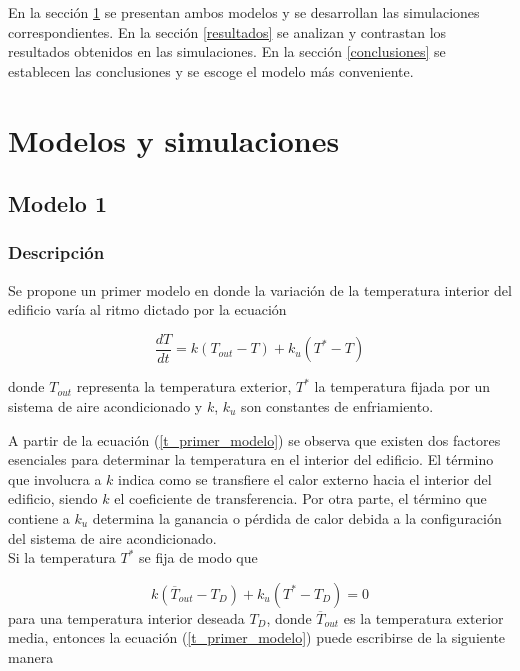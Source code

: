 \documentclass{sig-alternate}
\begin{document}
En la secci\'{o}n \ref{modelosysimulaciones} se presentan ambos modelos y
se de\-sa\-rro\-llan las simulaciones correspondientes.
En la secci\'{o}n \ref{resultados} se analizan y contrastan los resultados
obtenidos en las simulaciones.
En la secci\'{o}n \ref{conclusiones} se establecen las conclusiones y se
escoge el modelo m\'{a}s conveniente.

\section{Modelos y simulaciones}\label{modelosysimulaciones}

\subsection{Modelo 1}

\subsubsection{Descripci\'{o}n}

Se propone un primer modelo en donde la variaci\'{o}n de la temperatura interior
del edificio var\'{i}a al ritmo dictado por la ecuaci\'{o}n

\begin{equation}
\label{t_primer_modelo}
\frac{dT}{dt} = k ( T_{out} - T ) + k_{u} ( T^{*} - T )
\end{equation}

donde $T_{out}$ representa la temperatura exterior, $T^{*}$ la temperatura
fijada por un sistema de aire acondicionado y $k$, $k_{u}$ son constantes
de enfriamiento.

A partir de la ecuaci\'{o}n (\ref{t_primer_modelo}) se observa que existen dos
factores esenciales para determinar la temperatura en el interior del edificio.
El t\'{e}rmino que involucra a $k$ indica como se
transfiere el calor externo hacia el interior del edificio, siendo $k$ el
coeficiente de transferencia. Por otra parte, el t\'{e}rmino que contiene a $k_{u}$
 determina la ganancia o p\'{e}rdida de calor debida a la configuraci\'{o}n del 
sistema de aire acondicionado. \\
Si la temperatura $T^{*}$ se fija de modo que 

\begin{equation}
\label{t_fijada}
k ( \overline{T}_{out} - T_{D})
+ k_{u} ( T^{*} - T_{D} ) = 0
\end{equation}
para una temperatura interior deseada $T_{D}$,
donde $\overline{T}_{out}$ es la temperatura exterior media, entonces la
ecuaci\'{o}n (\ref{t_primer_modelo}) puede escribirse de la siguiente manera
\end{document}
